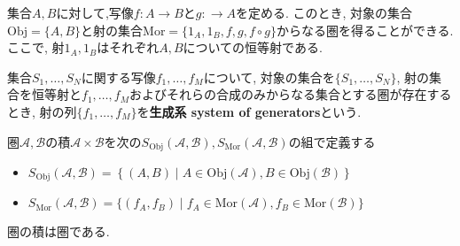 \begin{Prop}
集合$A,B$に対して,写像$f:A\rightarrow B$と$g:\rightarrow A$を定める.
このとき, 対象の集合$\mathrm{Obj}=\{A,B\}$と射の集合$\mathrm{Mor}=\{1_A,1_B,f,g,f\circ g\}$からなる圏を得ることができる.
ここで, 射$1_A,1_B$はそれぞれ$A,B$についての恒等射である.
\end{Prop}
\begin{comment}
\begin{proof}
\end{proof}
\end{comment}
\begin{Def}
集合$S_1,\dots,S_N$に関する写像$f_1,\dots,f_M$について,
対象の集合を$\{S_1,\dots,S_N\}$,
射の集合を恒等射と$f_1,\dots,f_M$およびそれらの合成のみからなる集合とする圏が存在するとき, 射の列$\{f_1,\dots,f_M\}$を{\bf 生成系 system of generators}という.
\end{Def}
\begin{Def}
圏$\mathscr{A},\mathscr{B}$の積$\mathscr{A}\times\mathscr{B}$を次の$S_{\mathrm{Obj}}\left(\mathscr{A},\mathscr{B}\right),S_{\mathrm{Mor}}\left(\mathscr{A},\mathscr{B}\right)$の組で定義する
\begin{itemize}
\item $S_{\mathrm{Obj}}\left(\mathscr{A},\mathscr{B}\right)
=\left\{(A,B)\mid A\in\mathrm{Obj}(\mathscr{A}),B\in\mathrm{Obj}(\mathscr{B})\right\}$
\item $S_{\mathrm{Mor}}\left(\mathscr{A},\mathscr{B}\right)
=\{(f_A,f_B)\mid f_A\in\mathrm{Mor(\mathscr{A})},
f_B\in\mathrm{Mor(\mathscr{B})}\}$
\end{itemize}
\end{Def}
\begin{Prop}
圏の積は圏である.
\end{Prop}

